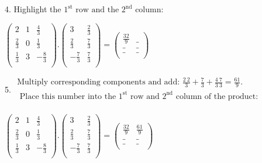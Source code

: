 \documentclass{article}
\begin{document}
4. Highlight the $1^{\text{st}}\text{ row and the }2^{\text{nd}}$ column:

$\left(
        \begin{array}{ccc}
2           & 1 & \frac{4}{3}  \\
                \frac{2}{3} & 0 & \frac{1}{3}  \\
                \frac{1}{3} & 3 & -\frac{8}{3} \\
            \end{array}
        \right).\left(
        \begin{array}{cc}
3            & \frac{2}{3} \\
                \frac{2}{3}  & \frac{7}{3} \\
                -\frac{7}{3} & \frac{7}{3} \\
            \end{array}
        \right)=\left(
        \begin{array}{cc}
\frac{32}{9} & \_ \\
                \_           & \_ \\
                \_           & \_ \\
            \end{array}
        \right)$

5. $\begin{array}{l}
\text{Multiply corresponding components and add: }\frac{2\ 2}{3}+\frac{7}{3}+\frac{4\ 7}{3\ 3}=\frac{61}{9}.                           \\
\text{            Place this number into the }1^{\text{st}}\text{ row and }2^{\text{nd}}\text{ column of the product}: \\
        \end{array}$

$\left(
        \begin{array}{ccc}
2           & 1 & \frac{4}{3}  \\
                \frac{2}{3} & 0 & \frac{1}{3}  \\
                \frac{1}{3} & 3 & -\frac{8}{3} \\
            \end{array}
        \right).\left(
        \begin{array}{cc}
3            & \frac{2}{3} \\
                \frac{2}{3}  & \frac{7}{3} \\
                -\frac{7}{3} & \frac{7}{3} \\
            \end{array}
        \right)=\left(
        \begin{array}{cc}
\frac{32}{9} & \frac{61}{9} \\
                \_           & \_                    \\
                \_           & \_                    \\
            \end{array}
        \right)$
\end{document}
